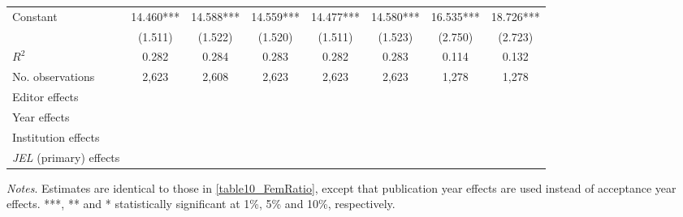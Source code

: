 \begin{table}
\begin{adjustwidth}{-0.085cm}{}
\begin{threeparttable}
\begin{tabular}{p{2.64cm}SSSSSSS}
            Constant                      &      14.460***&      14.588***&      14.559***&      14.477***&      14.580***&      16.535***&      18.726***\\
                                          &     (1.511)   &     (1.522)   &     (1.520)   &     (1.511)   &     (1.523)   &     (2.750)   &     (2.723)   \\
            \midrule
            \(R^2\)                       &       0.282   &       0.284   &       0.283   &       0.282   &       0.283   &       0.114   &       0.132   \\
            No. observations              &       2,623   &       2,608   &       2,623   &       2,623   &       2,623   &       1,278   &       1,278   \\
            \midrule
            Editor effects       &           {}   &           {}   &           {}   &           {}   &           {}   &           {}   &           {}   \\
            Year effects                  &           {}   &           {}   &           {}   &           {}   &           {}   &           {}   &           {}   \\
            Institution effects           &           {}   &           {}   &           {}   &           {}   &           {}   &           {}   &           {}   \\
            \textit{JEL} (primary) effects&               &               &               &               &               &               &           {}   \\
            \bottomrule
        \end{tabular}
        \begin{tablenotes}
            \tiny
            \item \textit{Notes}. Estimates are identical to those in \autoref{table10_FemRatio}, except that publication year effects are used instead of acceptance year effects. ***, ** and * statistically significant at 1\%, 5\% and 10\%, respectively.
        \end{tablenotes}
    \end{threeparttable}
    \end{adjustwidth}
\end{table}